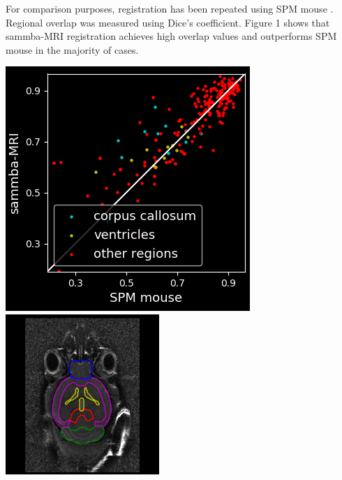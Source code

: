 \documentclass[a0paper,portrait]{baposter}
\begin{document}
\begin{poster}
{\begin{minipage}[t]{0.45\textwidth}
For comparison purposes, registration has been repeated using SPM mouse \cite{sawiak:2009}.
Regional overlap was measured
using Dice's coefficient.
Figure 1 shows that sammba-MRI registration achieves
high overlap values and outperforms SPM mouse in the majority of cases.
\end{minipage}\hspace{.2em}
\begin{minipage}[t]{0.54\textwidth}
\begin{center}
\label{fig:dice}
\includegraphics[height=.12\textheight]{bil2_transfo_dice_boxplots.png}
\includegraphics[height=.12\textheight]{atlas_overlays_dim-1pt6.png}
\end{center}
\end{minipage}






}
\end{poster}
\end{document}

